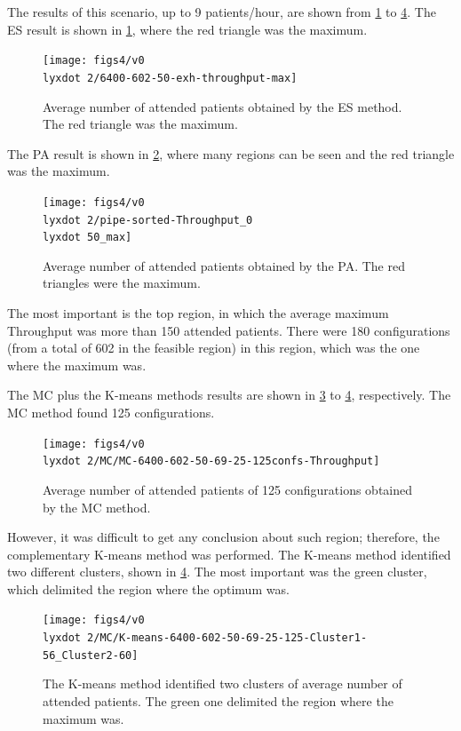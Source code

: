 \documentclass[11pt]{article} %
\begin{document}
The results of this scenario, up to 9 patients/hour, are shown from
\ref{subfig:es8-2} to \ref{subfig:km8-2}. The ES result is shown
in \ref{subfig:es8-2}, where the red triangle was the maximum. 
\begin{figure}[H]
\centering{}\texttt{[image: figs4/v0\\lyxdot 2/6400-602-50-exh-throughput-max]}\caption{Average number of attended patients obtained by the ES method. The
red triangle was the maximum.\label{subfig:es8-2}}
\end{figure}


The PA result is shown in \ref{subfig:pipe8-2}, where many regions
can be seen and the red triangle was the maximum. 
\begin{figure}[H]
\centering{}\texttt{[image: figs4/v0\\lyxdot 2/pipe-sorted-Throughput\_0\\lyxdot 50\_max]}\caption{Average number of attended patients obtained by the PA. The red triangles
were the maximum.\label{subfig:pipe8-2}}
\end{figure}
 The most important is the top region, in which the average maximum
Throughput was more than 150 attended patients. There were 180 configurations
(from a total of 602 in the feasible region) in this region, which
was the one where the maximum was.

The MC plus the K-means methods results are shown in \ref{subfig:mc8-2}
to \ref{subfig:km8-2}, respectively. The MC method found 125 configurations.
\begin{figure}[H]
\centering{}\texttt{[image: figs4/v0\\lyxdot 2/MC/MC-6400-602-50-69-25-125confs-Throughput]}\caption{Average number of attended patients of 125 configurations obtained
by the MC method. \label{subfig:mc8-2}}
\end{figure}
 However, it was difficult to get any conclusion about such region;
therefore, the complementary K-means method was performed. The K-means
method identified two different clusters, shown in \ref{subfig:km8-2}.
The most important was the green cluster, which delimited the region
where the optimum was.
\begin{figure}[H]
\begin{centering}
\texttt{[image: figs4/v0\\lyxdot 2/MC/K-means-6400-602-50-69-25-125-Cluster1-56\_Cluster2-60]}
\par\end{centering}

\caption{The K-means method identified two clusters of average number of attended
patients. The green one delimited the region where the maximum was.\label{subfig:km8-2}}
\end{figure}
\end{document}
